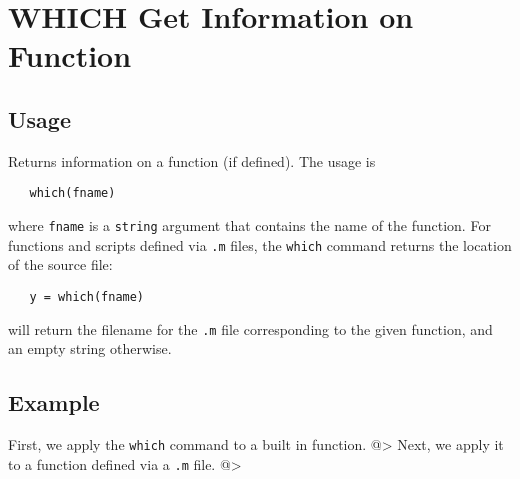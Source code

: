 \section{WHICH Get Information on Function}

\subsection{Usage}

Returns information on a function (if defined).  The usage is
\begin{verbatim}
   which(fname)
\end{verbatim}
where \verb|fname| is a \verb|string| argument that contains the name of the 
function.  For functions and scripts defined
via \verb|.m| files, the \verb|which| command returns the location of the source
file:
\begin{verbatim}
   y = which(fname)
\end{verbatim}
will return the filename for the \verb|.m| file corresponding to the given
function, and an empty string otherwise.
\subsection{Example}

First, we apply the \verb|which| command to a built in function.
@>
Next, we apply it to a function defined via a \verb|.m| file.
@>
